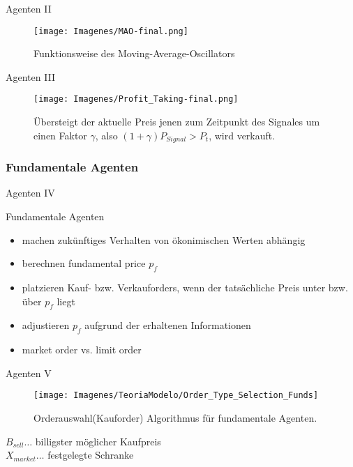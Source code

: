 \documentclass{beamer}
\begin{document}
	\begin{frame}{Agenten II}
		\begin{figure}[h!]	
			\centering		
			\texttt{[image: Imagenes/MAO-final.png]}
			\caption{Funktionsweise des Moving-Average-Oscillators}
		\end{figure}
	\end{frame}

	\begin{frame}{Agenten III}
		\begin{figure}[h!]
			\texttt{[image: Imagenes/Profit\_Taking-final.png]}
			\caption{Übersteigt der aktuelle Preis jenen zum Zeitpunkt des Signales um einen Faktor $\gamma$, also $(1+\gamma)P_{Signal}>P_t$, wird verkauft.}
		\end{figure}
	\end{frame}
\subsubsection{Fundamentale Agenten}
	\begin{frame}{Agenten IV}
		\begin{block}{Fundamentale Agenten}
			\begin{itemize}
				\item machen zukünftiges Verhalten von ökonimischen Werten abhängig
				\item berechnen fundamental price $p_{f}$
				\item platzieren Kauf- bzw. Verkauforders, wenn der tatsächliche Preis unter bzw. über $p_{f}$ liegt
				\item adjustieren $p_f$ aufgrund der erhaltenen Informationen 
				\item market order vs. limit order
			\end{itemize}
		\end{block}
	\end{frame}

	\begin{frame}{Agenten V}
		\begin{figure}[!h]
			\centering
			\texttt{[image: Imagenes/TeoriaModelo/Order\_Type\_Selection\_Funds]}
			\caption{Orderauswahl(Kauforder) Algorithmus für fundamentale Agenten.}
			\label{fig:FundsOrderSelection}
		\end{figure}
		$B_{sell} \dots$ billigster möglicher Kaufpreis \\
		$X_{market} \dots$ festgelegte Schranke
	\end{frame}
\end{document}
